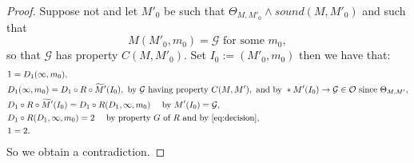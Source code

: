 \documentclass{amsart}  %
\numberwithin{equation}{section}
\theoremstyle{definition}
\theoremstyle{remark}
\begin{document}
{\begin{proof} Suppose not and let $M' _{0} $ be such that
$\Theta _{M,M' _{0} } \land sound (M,M' _{0} )$ and such that
\begin{equation*} 
M (M' _{0},m _{0} ) = \mathcal{G}  \text{ for some $m _{0}$},
\end{equation*}
so that $\mathcal{G}$ has property $C (M,M' _{0})$.
Set $I _{0}:= (M' _{0} ,m _{0} )$ then we have that:
\begin{align*} 
      & 1= D_1 (\infty, m _{0} ), \\
      &  D_1 (\infty, m _{0}) = D_1 \circ R \circ  \widetilde{M}'(I _{0} ),  \text{ by $\mathcal{G}$ having property $C (M,M')$} , \text{ and by } *M'  (I _{0} ) \to \mathcal{G} \in \mathcal{O} \text{ since $\Theta _{M,M'} $},  \\
 &  D_1 \circ R \circ  \widetilde{M}'  (I _{0}) = D_1 \circ R (D_1, \infty, m _{0} )   \quad \text{ by $M' (I _{0} ) = \mathcal{G}$}, \\
 &  D_1 \circ R (D_1, \infty, m _{0} )=2 \quad \text{ by property $G$ of $R$ and by \eqref{eq:decision}}, \\
& 1=2.
\end{align*}
So we obtain a contradiction.
%
%
%


\end{proof}}
\end{document}
